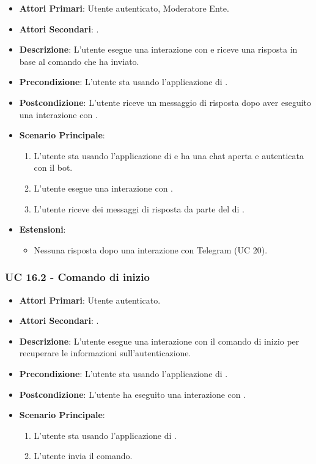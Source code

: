 	\begin{itemize}
		\item \textbf{Attori Primari}: Utente autenticato, Moderatore Ente.
		\item \textbf{Attori Secondari}: .
		\item \textbf{Descrizione}: L'utente esegue una interazione con  e riceve una risposta in base al comando che ha inviato. 
		\item \textbf{Precondizione}: L'utente sta usando l'applicazione di .
		\item \textbf{Postcondizione}: L'utente riceve un messaggio di risposta dopo aver eseguito una interazione con .
		\item \textbf{Scenario Principale}:
		\begin{enumerate}
			\item L'utente sta usando l'applicazione di  e ha una chat aperta e autenticata con il bot. 
			\item L'utente esegue una interazione con .
			\item L'utente riceve dei messaggi di risposta da parte del  di .
		\end{enumerate}
		\item \textbf{Estensioni}:
		\begin{itemize}
			\item Nessuna risposta dopo una interazione con Telegram (UC 20).
		\end{itemize}
	\end{itemize}

	\subsubsection{UC 16.2 - Comando di inizio}


	\begin{itemize}
		\item \textbf{Attori Primari}: Utente autenticato.
		\item \textbf{Attori Secondari}: .
		\item \textbf{Descrizione}: L'utente esegue una interazione con il comando di inizio per recuperare le informazioni sull'autenticazione.
		\item \textbf{Precondizione}: L'utente sta usando l'applicazione di .
		\item \textbf{Postcondizione}: L'utente ha eseguito una interazione con .
		\item \textbf{Scenario Principale}:
		\begin{enumerate}
			\item L'utente sta usando l'applicazione di . 
			\item L'utente invia il comando.
		\end{enumerate}
	\end{itemize}



